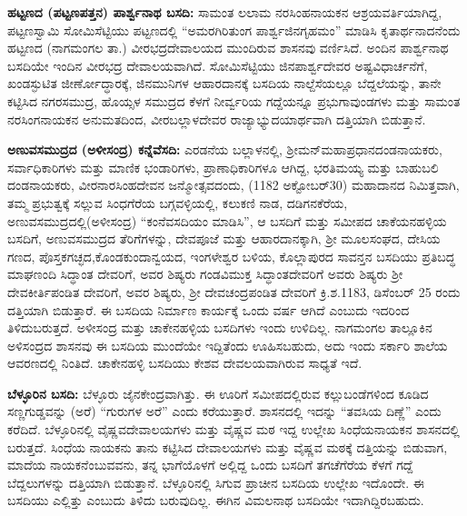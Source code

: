 \textbf{ಹಟ್ಟಣದ (ಪಟ್ಟಣ\general{\enginline{-}}ಪತ್ತನ) ಪಾರ್ಶ್ವನಾಥ ಬಸದಿ:} ಸಾಮಂತ ಲಲಾಮ ನರಸಿಂಹನಾಯಕನ ಆಶ್ರಯವರ್ತಿಯಾಗಿದ್ದ, ಪಟ್ಟಣಸ್ವಾಮಿ ಸೋಮಿಸೆಟ್ಟಿಯು ಪಟ್ಟಣದಲ್ಲಿ “ಅಮರಗಿರಿತುಂಗ ಪಾರ್ಶ್ವಜಿನಗೃಹಮಂ” ಮಾಡಿಸಿ ಕೃತಾರ್ಥನಾದನೆಂದು ಹಟ್ಟಣದ (ನಾಗಮಂಗಲ ತಾ.) ವೀರಭದ್ರದೇವಾಲಯದ ಮುಂದಿರುವ ಶಾಸನವು ವರ್ಣಿಸಿದೆ. ಅಂದಿನ ಪಾರ್ಶ್ವನಾಥ ಬಸದಿಯೇ ಇಂದಿನ ವೀರಭದ್ರ ದೇವಾಲಯವಾಗಿದೆ. ಸೋಮಿಸೆಟ್ಟಿಯು ಜಿನಪಾರ್ಶ್ವದೇವರ ಅಷ್ಟವಿಧಾರ್ಚನೆಗೆ, ಖಂಡಸ್ಫುಟಿತ ಜೀರ್ಣೋದ್ಧಾರಕ್ಕೆ, ಜಿನಮುನಿಗಳ ಆಹಾರದಾನಕ್ಕೆ ಬಸದಿಯ ನಾಲ್ದೆಸೆಯಲ್ಲೂ ಬೆದ್ದಲೆಯನ್ನು, ತಾನೇ ಕಟ್ಟಿಸಿದ ನಗರಸಮುದ್ರ, ಹೊಯ್ಸಳ ಸಮುದ್ರದ ಕೆಳಗೆ ನೀರ್ವ್ವರಿಯ ಗದ್ದೆಯನ್ನೂ ಪ್ರಭುಗಾವುಂಡಗಳು ಮತ್ತು ಸಾಮಂತ ನರಸಿಂಗನಾಯಕನ ಅನುಮತದಿಂದ, ವೀರಬಲ್ಲಾಳದೇವರ ರಾಜ್ಯಾಭ್ಯುದಯಾರ್ಥವಾಗಿ ದತ್ತಿಯಾಗಿ ಬಿಡುತ್ತಾನೆ.

\textbf{ಅಣುವಸಮುದ್ರದ (ಅಳೀಸಂದ್ರ) ಕನ್ನೆವೆಸದಿ:} ಎರಡನೆಯ ಬಲ್ಲಾಳನಲ್ಲಿ, ಶ‍್ರೀಮನ್​ ಮಹಾಪ್ರಧಾನ\break ದಂಡನಾಯಕರು, ಸರ್ವಾಧಿಕಾರಿಗಳು ಮತ್ತು ಮಾಣಿಕ ಭಂಡಾರಿಗಳು, ಪ್ರಾಣಾಧಿಕಾರಿಗಳೂ ಆಗಿದ್ದ, ಭರತಿಮಯ್ಯ ಮತ್ತು ಬಾಹುಬಲಿ ದಂಡನಾಯಕರು, ವೀರನಾರಸಿಂಹದೇವನ ಜನ್ಮೋತ್ಸವದಂದು, (1182 ಅಕ್ಟೋಬರ್​ 30) ಮಹಾದಾನದ ನಿಮಿತ್ತವಾಗಿ, ತಮ್ಮ ಪ್ರಭುತ್ವಕ್ಕೆ ಸಲ್ಲುವ ಸಿಂಧಗೆರೆಯ ಬಗ್ಗವಳ್ಳಿಯಲ್ಲಿ, ಕಲುಕಣಿ ನಾಡ, ದಡಿಗನಕೆರೆಯ, ಅಣುವಸಮುದ್ರ\-ದಲ್ಲಿ(ಅಳೀಸಂದ್ರ) “ಕಂನೆವಸದಿಯಂ ಮಾಡಿಸಿ”, ಆ ಬಸದಿಗೆ ಮತ್ತು ಸಮೀಪದ ಚಾಕೆಯನಹಳ್ಳಿಯ ಬಸದಿಗೆ, ಅಣುವ\-ಸಮುದ್ರದ ತೆರಿಗೆಗಳನ್ನು, ದೇವಪೂಜೆ ಮತ್ತು ಆಹಾರದಾನಕ್ಕಾಗಿ, ಶ‍್ರೀ ಮೂಲಸಂಘದ, ದೇಸಿಯ ಗಣದ, ಪೊಸ್ತಕಗಚ್ಛದ,\break ಕೊಂಡಕುಂದಾನ್ವಯದ, ಇಂಗಳೇಶ್ವರ ಬಳಿಯ, ಕೊಲ್ಲಾಪುರದ ಸಾವನ್ತನ ಬಸದಿಯು ಪ್ರತಿಬದ್ಧ ಮಾಘಣಂದಿ ಸಿದ್ಧಾಂತ ದೇವರಿಗೆ, ಅವರ ಶಿಷ್ಯರು ಗಂಡವಿಮುಕ್ತ ಸಿದ್ಧಾಂತದೇವರಿಗೆ ಅವರು ಶಿಷ್ಯರು ಶ‍್ರೀ ದೇವಕೀರ್ತಿಪಂಡಿತ ದೇವರಿಗೆ, ಅವರ ಶಿಷ್ಯರು, ಶ‍್ರೀ ದೇವಚಂದ್ರಪಂಡಿತ ದೇವರಿಗೆ ಕ್ರಿ.ಶ.1183, ಡಿಸೆಂಬರ್​ 25 ರಂದು ದತ್ತಿಯಾಗಿ ಬಿಡುತ್ತಾರೆ. ಈ ಬಸದಿಯ ನಿರ್ಮಾಣ ಕಾರ್ಯಕ್ಕೆ ಒಂದು ವರ್ಷ ಆಗಿದೆ ಎಂಬುದು ಇದರಿಂದ ತಿಳಿದುಬರುತ್ತದೆ. ಅಳೀಸಂದ್ರ ಮತ್ತು ಚಾಕೇನಹಳ್ಳಿಯ ಬಸದಿಗಳು ಇಂದು ಉಳಿದಿಲ್ಲ. ನಾಗಮಂಗಲ ತಾಲ್ಲೂಕಿನ ಅಳಿಸಂದ್ರದ ಶಾಸನವು ಈ ಬಸದಿಯ ಮುಂದೆಯೇ ಇದ್ದಿತೆಂದು ಊಹಿಸಬಹುದು, ಅದು ಇಂದು ಸರ್ಕಾರಿ ಶಾಲೆಯ ಆವರಣದಲ್ಲಿ ನಿಂತಿದೆ. ಚಾಕೇನಹಳ್ಳಿ ಬಸದಿಯು ಕೇಶವ ದೇವಲಯ\-ವಾಗಿರುವ ಸಾಧ್ಯತೆ ಇದೆ.

\textbf{ಬೆಳ್ಳೂರಿನ ಬಸದಿ:} ಬೆಳ್ಳೂರು ಜೈನಕೇಂದ್ರವಾಗಿತ್ತು. ಈ ಊರಿಗೆ ಸಮೀಪದಲ್ಲಿರುವ ಕಲ್ಲುಬಂಡೆಗಳಿಂದ ಕೂಡಿದ ಸಣ್ಣಗುಡ್ಡವನ್ನು (ಅರೆ) “ಗುರುಗಳ ಅರೆ” ಎಂದು ಕರೆಯುತ್ತಾರೆ. ಶಾಸನದಲ್ಲಿ ಇದನ್ನು “ತವಸಿಯ ದಿಣ್ಣೆ” ಎಂದು ಕರೆದಿದೆ. ಬೆಳ್ಳೂರಿನಲ್ಲಿ ವೈಷ್ಣವದೇವಾಲಯಗಳು ಮತ್ತು ವೈಷ್ಣವ ಮಠ ಇದ್ದ ಉಲ್ಲೇಖ ಸಿಂಧೆಯನಾಯಕನ ಶಾಸನದಲ್ಲಿ ಬರುತ್ತದೆ. ಸಿಂಧೆಯ ನಾಯಕನು ತಾನು ಕಟ್ಟಿಸಿದ ದೇವಾಲಯಗಳು ಮತ್ತು ವೈಷ್ಣವ ಮಠಕ್ಕೆ ದತ್ತಿಯನ್ನು ಬಿಡುವಾಗ, ಮಾದೆಯ ನಾಯಕನೆಂಬುವವನು, ತನ್ನ ಭಾಗೆಯೊಳಗೆ ಅಲ್ಲಿದ್ದ ಒಂದು ಬಸದಿಗೆ ತಗಚೆಗೆರೆಯ ಕೆಳಗೆ ಗದ್ದೆ ಬೆದ್ದಲುಗಳನ್ನು ದತ್ತಿಯಾಗಿ ಬಿಡುತ್ತಾನೆ. ಬೆಳ್ಳೂರಿನಲ್ಲಿ ಸಿಗುವ ಪ್ರಾಚೀನ ಬಸದಿಯ ಉಲ್ಲೇಖ ಇದೊಂದೇ. ಈ ಬಸದಿಯು ಎಲ್ಲಿತ್ತು ಎಂಬುದು ತಿಳಿದು ಬರುವುದಿಲ್ಲ. ಈಗಿನ ವಿಮಲನಾಥ ಬಸದಿಯೇ ಇದಾಗಿದ್ದಿರಬಹುದು.

